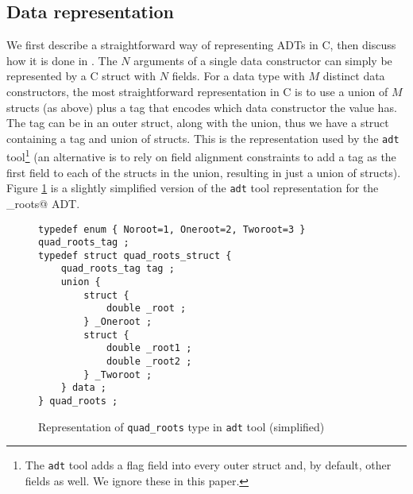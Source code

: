 \subsection{Data representation}
\label{sec-rep}

We first describe a straightforward way of representing ADTs in C, then
discuss how it is done in \adtpp.
The $N$ arguments of a single data constructor can simply be represented
by a C struct with $N$ fields.  For a data type with $M$ distinct data
constructors, the most straightforward representation in C is to use a
union of $M$ structs (as above)
plus a tag that encodes which data constructor the value has.  The tag
can be in an outer struct, along with the union, thus we have a struct
containing a tag and union of structs.  This is the representation used
by the \texttt{adt} tool\footnote{The \texttt{adt} tool adds a flag field
into every outer struct and, by default, other fields as well.  We ignore
these in this paper.} \cite{adttool} (an alternative is to rely on
field alignment constraints to add a tag as the first field to each of the
structs in the union, resulting in just a union of structs).  Figure
\ref{fig:adtrep} is a
slightly simplified version of the \texttt{adt} tool representation for the
\verb@quad_roots@ ADT.


\begin{figure}
\begin{verbatim}
typedef enum { Noroot=1, Oneroot=2, Tworoot=3 } quad_roots_tag ;
typedef struct quad_roots_struct {
    quad_roots_tag tag ;
    union {
        struct {
            double _root ;
        } _Oneroot ;
        struct {
            double _root1 ;
            double _root2 ;
        } _Tworoot ;
    } data ;
} quad_roots ;
\end{verbatim}
\caption{Representation of \texttt{quad\_roots} type in \texttt{adt}
tool (simplified)}
\label{fig:adtrep}
\end{figure}

